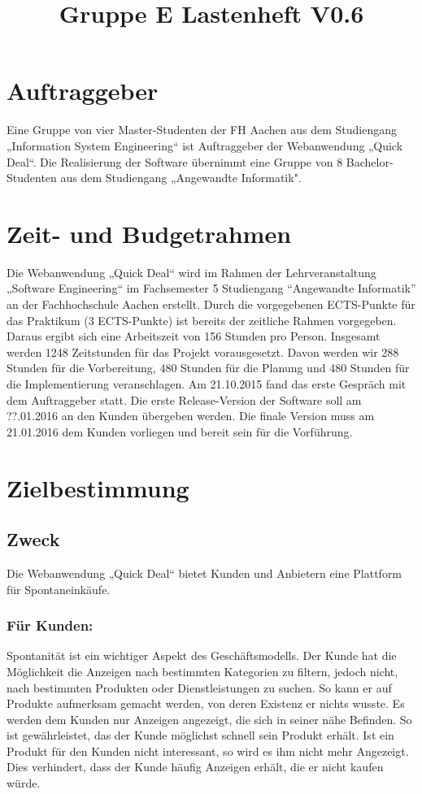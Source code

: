\documentclass[a4paper,12pt,oneside]{scrartcl}
\title{Gruppe E Lastenheft V0.6}
\begin{document}
\maketitle
\newpage
\tableofcontents
\newpage

\section{Auftraggeber}
Eine Gruppe von vier Master-Studenten der FH Aachen aus dem Studiengang „Information System Engineering“ ist Auftraggeber der Webanwendung „Quick Deal“. 
Die Realisierung der Software übernimmt eine Gruppe von 8 Bachelor-Studenten aus dem Studiengang „Angewandte Informatik".




\section{Zeit- und Budgetrahmen}
Die Webanwendung „Quick Deal“ wird im Rahmen der Lehrveranstaltung „Software Engineering“ im Fachsemester 5 Studiengang “Angewandte Informatik” an der Fachhochschule Aachen erstellt.
Durch die vorgegebenen ECTS-Punkte für das Praktikum (3 ECTS-Punkte) ist bereits der zeitliche Rahmen vorgegeben.
Daraus ergibt sich eine Arbeitszeit von 156 Stunden pro Person. Insgesamt werden 1248 Zeitstunden für das Projekt vorausgesetzt. 
Davon werden wir 288 Stunden für die Vorbereitung, 480 Stunden für die Planung und 480 Stunden für die Implementierung veranschlagen. 
Am 21.10.2015 fand das erste Gespräch mit dem Auftraggeber statt.
Die erste Release-Version der Software soll am ??.01.2016 an den Kunden übergeben werden.
Die finale Version muss am 21.01.2016 dem Kunden vorliegen und bereit sein für die Vorführung. 




\section{Zielbestimmung}
\subsection{Zweck}
Die Webanwendung „Quick Deal“ bietet Kunden und Anbietern eine Plattform für Spontaneinkäufe.
\subsubsection*{Für Kunden:}
Spontanität ist ein wichtiger Aspekt des Geschäftsmodells.
Der Kunde hat die Möglichkeit die Anzeigen nach bestimmten Kategorien zu filtern, jedoch nicht, nach bestimmten Produkten oder Dienstleistungen zu suchen.
So kann er auf Produkte aufmerksam gemacht werden, von deren Existenz er nichts wusste.
Es werden dem Kunden nur Anzeigen angezeigt, die sich in seiner nähe Befinden.
So ist gewährleistet, das der Kunde möglichst schnell sein Produkt erhält.
Ist ein Produkt für den Kunden nicht interessant, so wird es ihm nicht mehr Angezeigt.
Dies verhindert, dass der Kunde häufig Anzeigen erhält, die er nicht kaufen würde.
\end{document}
